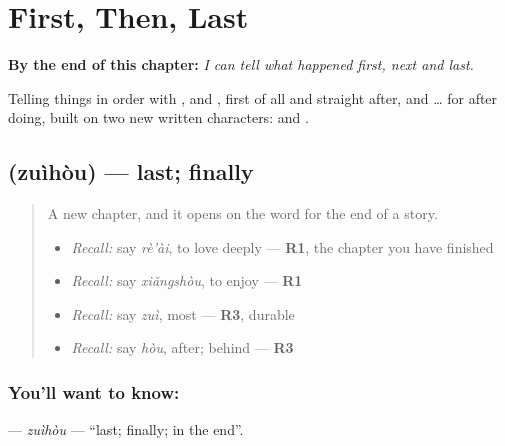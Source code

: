 
\chapter{First, Then, Last}
\label{ch:zh-first-then-last}

\begin{chapteropening}
\textbf{By the end of this chapter:} \emph{I can tell what happened first, next and last.}

Telling things in order with ,  and , first of all and straight after, and  …  for after doing, built on two new written characters:  and .
\end{chapteropening}

\section[\texorpdfstring{\zh{最后} (zuìhòu)}{最后 (zuìhòu)}]{ (zuìhòu) — last; finally}

\label{lesson:ZH-C278-zuihou}



\begin{quote}
A new chapter, and it opens on the word for the end of a story.

\begin{itemize}
\raggedright
  \item \emph{Recall:} say \emph{rè'ài}, to love deeply — \textbf{R1}, the chapter you have finished
  \item \emph{Recall:} say \emph{xiǎngshòu}, to enjoy — \textbf{R1}
  \item \emph{Recall:} say \emph{zuì}, most — \textbf{R3}, durable
  \item \emph{Recall:} say \emph{hòu}, after; behind — \textbf{R3}
\end{itemize}
\end{quote}

\subsection*{You'll want to know: }
\textbf{} — \emph{zuìhòu} — \textquotedblleft{}last; finally; in the end\textquotedblright{}.

